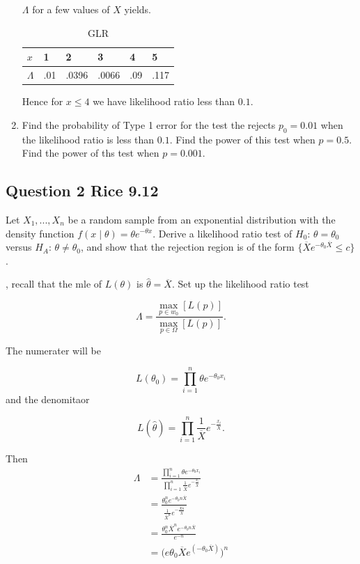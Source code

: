 \documentclass{tufte-book}
\theoremstyle{mytheoremstyle}
\theoremstyle{mylemstyle}
\theoremstyle{mydefstyle}
\begin{document}
\begin{enumerate}
 $\Lambda$ for a few values of $X$ yields.
\begin{table}
\centering
\caption{GLR}
\label{my-label1}
\begin{tabular}{l|lllll}
$x$ & 1 & 2 & 3    & 4 & 5    \\ \hline
$\Lambda$ & .01 & .0396 & .0066 & .09 & .117
\end{tabular}
\end{table}

Hence for $x \leq 4$ we have likelihood ratio less than $0.1$.

\item Find the probability of Type 1 error for the test the rejects $p_0=0.01$ when the likelihood ratio is less than $0.1$.  Find the power of this test when $p=0.5$.  Find the power of ths test when $p=0.001$.


\end{enumerate}


\subsection{Question 2 Rice 9.12}

Let $X_1,...,X_n$ be a random sample from an exponential distribution with the density function $f(x\mid \theta)= \theta e^{-\theta x}$.  Derive a likelihood ratio test of $H_0$: $\theta = \theta_0$ versus $H_A$: $\theta \neq \theta_0$, and show that the rejection region is of the form $\{\overline{X}e^{-\theta_0\overline{X}} \leq c \}$.

,  recall that the mle of $L(\theta)$ is $\hat{\theta}=\overline{X}$.  Set up the likelihood ratio test

\[ \Lambda = \frac{\max_{p \in w_0}[L(p)]}{\max_{p \in \Omega}[L(p)]}. \]

The numerater will be

\[ L(\theta_0) = \prod_{i=1}^n \theta e^{-\theta_0 x_i} \]
and the denomitaor

\[ L(\hat{\theta}) = \prod_{i=1}^n \frac{1}{\overline{X}} e^{-\frac{x_i}{\overline{X}}}. \]

Then
\begin{align*}
\Lambda &= \frac{\prod_{i=1}^n \theta e^{-\theta_0 x_i}}{\prod_{i=1}^n \frac{1}{\overline{X}} e^{-\frac{x_i}{\overline{X}}}}\\
&= \frac{\theta_0^n e^{-\theta_0 n\overline{X}}}{\frac{1}{\overline{X}^n}e^{-\frac{\overline{X}n}{\overline{X}}}}\\
&= \frac{\theta_0^n \overline{X}^n e^{-\theta_0 n\overline{X}}}{e^{-n}}\\
&= \big(e \theta_0 \overline{X} e^{(-\theta_0 \overline{X})}\big)^n
\end{align*}
\end{document}
